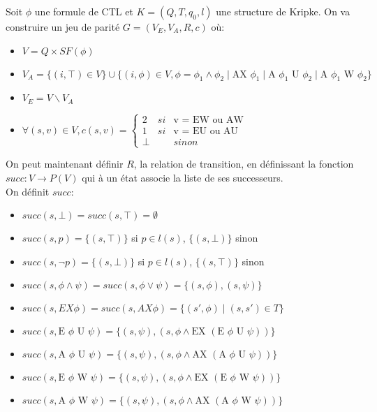 \documentclass[10pt,a4paper]{article}
\begin{document}
Soit $\phi$ une formule de CTL et $K = (Q,T,q_0,l)$  une structure de Kripke.
On va construire un jeu de parité $G = (V_E,V_A,R,c)$ où:
\begin{itemize}
	\item $V = Q \times SF(\phi)$
	\item $V_A = \{(i, \top ) \in V\} \cup \{(i, \phi) \in V, \phi = \phi_1 \land \phi_2 \mid \mbox{AX } \phi_1\mid \mbox{A } \phi_1 \mbox{ U } \phi_2 \mid \mbox{A } \phi_1 \mbox{ W } \phi_2\}$
	\item $V_E = V \backslash V_A$
	\item $\forall (s,v) \in V, c(s,v) = \left \{
	\begin{array}{rcl}
		2 & si & \text{v = EW ou AW}\\
		1 & si & \text{v = EU ou AU}\\
		\bot && sinon
	\end{array}
	\right .$
\end{itemize}

\bigskip

On peut maintenant définir $R$, la relation de transition, en définissant la fonction $succ : V \to P(V)$ qui à un état associe la liste de ses successeurs.\\

On définit $succ$:
\begin{itemize}
\item$ succ(s, \bot) = succ(s, \top) = \emptyset$
\item $succ(s, p) = \{(s,\top)\}$ si $p \in l(s)$, $\{(s,\bot)\}$ sinon
\item $succ(s, \neg p) = \{(s,\bot)\}$ si $p \in l(s)$, $\{(s,\top)\}$ sinon
\item $succ(s,\phi \land \psi) = succ(s, \phi \lor \psi) = \{(s,\phi), (s,\psi) \}$
\item $succ(s,EX \phi) = succ(s, AX \phi) = \{ (s', \phi) \mid (s,s') \in T \} $
\item $succ(s, \mbox{E } \phi \mbox{ U } \psi) = \{ (s,\psi), (s, \phi \land \mbox{EX }  (\mbox{E } \phi \mbox{ U } \psi)) \}$
\item $succ(s, \mbox{A } \phi \mbox{ U } \psi) = \{ (s,\psi), (s, \phi \land \mbox{AX }  (\mbox{A } \phi \mbox{ U } \psi)) \}$
\item $succ(s, \mbox{E } \phi \mbox{ W } \psi) = \{ (s,\psi), (s, \phi \land \mbox{EX }  (\mbox{E } \phi \mbox{ W } \psi)) \}$
\item $succ(s, \mbox{A } \phi \mbox{ W } \psi) = \{ (s,\psi), (s, \phi \land \mbox{AX } (\mbox{A } \phi \mbox{ W } \psi)) \}$
\end{itemize}
\end{document}
